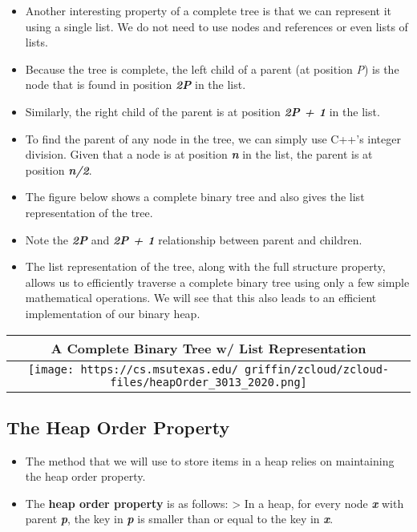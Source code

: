 \documentclass[
]{article}
\providecommand{\tightlist}{%
  \setlength{\itemsep}{0pt}\setlength{\parskip}{0pt}}
\begin{document}
\begin{itemize}
\tightlist
\item
  Another interesting property of a complete tree is that we can
  represent it using a single list. We do not need to use nodes and
  references or even lists of lists.
\item
  Because the tree is complete, the left child of a parent (at position
  \emph{P}) is the node that is found in position \textbf{\emph{2P}} in
  the list.
\item
  Similarly, the right child of the parent is at position
  \textbf{\emph{2P + 1}} in the list.
\item
  To find the parent of any node in the tree, we can simply use C++'s
  integer division. Given that a node is at position \textbf{\emph{n}}
  in the list, the parent is at position \textbf{\emph{n/2}}.
\item
  The figure below shows a complete binary tree and also gives the list
  representation of the tree.
\item
  Note the \textbf{\emph{2P}} and \textbf{\emph{2P + 1}} relationship
  between parent and children.
\item
  The list representation of the tree, along with the full structure
  property, allows us to efficiently traverse a complete binary tree
  using only a few simple mathematical operations. We will see that this
  also leads to an efficient implementation of our binary heap.
\end{itemize}

\begin{longtable}[]{@{}c@{}}
\toprule
A Complete Binary Tree w/ List Representation\tabularnewline
\midrule
\endhead
\texttt{[image: https://cs.msutexas.edu/~griffin/zcloud/zcloud-files/heapOrder\_3013\_2020.png]}\tabularnewline
\bottomrule
\end{longtable}

\hypertarget{the-heap-order-property}{%
\subsection{The Heap Order Property}\label{the-heap-order-property}}

\begin{itemize}
\tightlist
\item
  The method that we will use to store items in a heap relies on
  maintaining the heap order property.
\item
  The \textbf{heap order property} is as follows: \textgreater{} In a
  heap, for every node \textbf{\emph{x}} with parent \textbf{\emph{p}},
  the key in \textbf{\emph{p}} is smaller than or equal to the key in
  \textbf{\emph{x}}.
\end{itemize}
\end{document}
